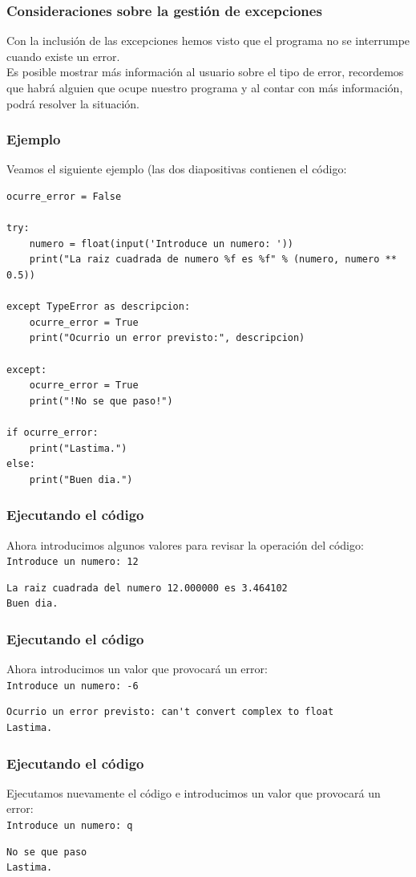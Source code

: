 \documentclass[12pt]{beamer}
\begin{document}
\begin{frame}[fragile]
\frametitle{Consideraciones sobre la gestión de excepciones}
Con la inclusión de las excepciones hemos visto que el programa no se interrumpe cuando existe un error.
\\
\bigskip
Es posible mostrar más información al usuario sobre el tipo de error, recordemos que habrá alguien que ocupe nuestro programa y al contar con más información, podrá resolver la situación.
\end{frame}
\begin{frame}
\frametitle{Ejemplo}
Veamos el siguiente ejemplo (las dos diapositivas contienen el código:
\fontsize{11}{10}\selectfont
\begin{lstlisting}
ocurre_error = False

try:
    numero = float(input('Introduce un numero: '))
    print("La raiz cuadrada de numero %f es %f" % (numero, numero ** 0.5))

except TypeError as descripcion:
    ocurre_error = True
    print("Ocurrio un error previsto:", descripcion)

except:
    ocurre_error = True
    print("!No se que paso!")

if ocurre_error:
    print("Lastima.")
else:
    print("Buen dia.")
\end{lstlisting}
\end{frame}
\begin{frame}[fragile]
\frametitle{Ejecutando el código}
Ahora introducimos algunos valores para revisar la operación del código:
\\
\bigskip
\pause
\verb|Introduce un numero: 12|
\\
\pause
\begin{lstlisting}
La raiz cuadrada del numero 12.000000 es 3.464102
Buen dia.
\end{lstlisting}
\end{frame}
\begin{frame}[fragile]
\frametitle{Ejecutando el código}
Ahora introducimos un valor que provocará un error:
\\
\bigskip
\pause
\verb|Introduce un numero: -6|
\\
\pause
\begin{lstlisting}
Ocurrio un error previsto: can't convert complex to float
Lastima.
\end{lstlisting}
\end{frame}
\begin{frame}[fragile]
\frametitle{Ejecutando el código}
Ejecutamos nuevamente el código e introducimos un valor que provocará un error:
\\
\bigskip
\pause
\verb|Introduce un numero: q|
\\
\pause
\begin{verbatim}
No se que paso
Lastima.
\end{verbatim}
\end{frame}
\end{document}
